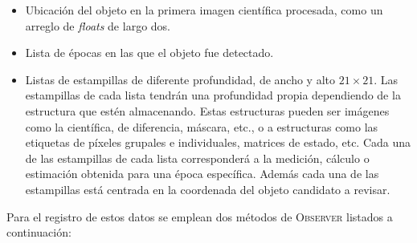 \begin{itemize}
\item Ubicaci\'on del objeto en la primera imagen cient\'ifica procesada, como un arreglo de \textit{floats} de largo dos. 
\item Lista de \'epocas en las que el objeto fue detectado.
\item Listas de estampillas de diferente profundidad, de ancho y alto $21 \times 21$. Las estampillas de cada lista tendr\'an una profundidad propia dependiendo de la estructura que est\'en almacenando. Estas estructuras pueden ser im\'agenes como la cient\'ifica, de diferencia, m\'ascara, etc., o a estructuras como las etiquetas de p\'ixeles grupales e individuales, matrices de estado, etc. Cada una de las estampillas de cada lista corresponder\'a a la medici\'on, c\'alculo o estimaci\'on obtenida para una \'epoca espec\'ifica. Adem\'as cada una de las estampillas est\'a centrada en la coordenada del objeto candidato a revisar.   
\end{itemize}
\bigskip

Para el registro de estos datos se emplean dos m\'etodos de \textsc{Observer} listados a continuaci\'on:

